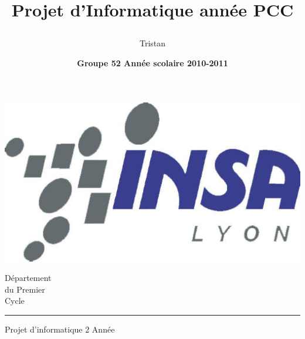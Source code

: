 \documentclass[12pt,twoside,a4paper,leqno,titlepage]{report}
\author{Tristan \bsc{Pourcelot}}
\title{\begin{center} \textbf{\Huge{Projet d'Informatique \newline 2\up{\`eme} ann\'ee PCC}} \end{center}}
\date{\textbf{ Groupe 52 \hspace{\stretch{1}} Ann\'ee scolaire 2010-2011  }}
\begin{document}
\begin{minipage}[c]{0.5\linewidth}
\includegraphics[bb=0 0 200 100, scale=0.8, clip]{insa.eps}
\end{minipage}
\begin{minipage}[r]{0.5\linewidth}
\vspace*{25pt}
\begin{flushright}
\LARGE D\'epartement \\ du Premier \\ Cycle \\ \rule{\linewidth}{2pt}
\end{flushright}
\end{minipage}

\vspace*{1cm}

\begin{center}
\LARGE Projet d'informatique 2  Ann\'ee\\
\end{center}
\vspace*{1.3cm}
	
\setlength\fboxrule{2pt}
\end{document}
